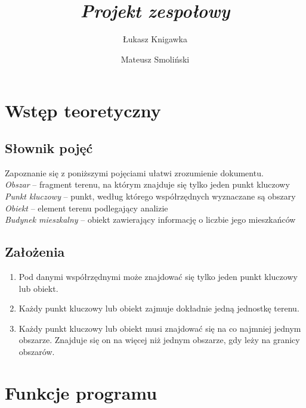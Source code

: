 \documentclass[a4paper,12pt]{article}
\title{ \sc{Specyfikacja funkcjonalna} \\
\emph{Projekt zespołowy} }
\author{Łukasz Knigawka \and Mateusz Smoliński}
\newcommand\tab[1][0.6cm]{\hspace*{#1} }
\begin{document}
\maketitle

\thispagestyle{empty}

\tableofcontents

\newpage

\section{Wstęp teoretyczny}

\subsection{Słownik pojęć}

\tab Zapoznanie się z poniższymi pojęciami ułatwi zrozumienie dokumentu. 
\\\textit{Obszar} -- fragment terenu, na którym znajduje się tylko jeden punkt kluczowy
\\\textit{Punkt kluczowy} -- punkt, według którego współrzędnych wyznaczane są obszary
\\\textit{Obiekt} -- element terenu podlegający analizie
\\\textit{Budynek mieszkalny} -- obiekt zawierający informację o liczbie jego mieszkańców

\subsection{Założenia}

\begin{enumerate}
\item Pod danymi współrzędnymi może znajdować się tylko jeden punkt kluczowy lub obiekt.
\item Każdy punkt kluczowy lub obiekt zajmuje dokładnie jedną jednostkę terenu.
\item Każdy punkt kluczowy lub obiekt musi znajdować się na co najmniej jednym obszarze. Znajduje się on na więcej niż jednym obszarze, gdy leży na granicy obszarów.
\end{enumerate}

\section{Funkcje programu}
\end{document}
